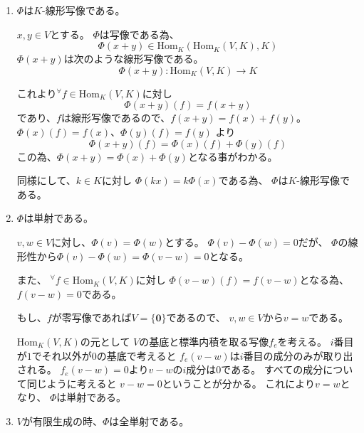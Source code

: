 \documentclass[12pt,b5paper]{ltjsarticle}
\begin{document}
\begin{enumerate}
 \item $\Phi$は$K$-線形写像である。

       $x,y\in V$とする。
       $\Phi$は写像である為、
       \begin{equation}
        \Phi (x+y) \in \mathrm{Hom}_K(\mathrm{Hom}_K(V,K),K)
       \end{equation}
       $\Phi(x+y)$は次のような線形写像である。
       \begin{equation}
        \Phi (x+y) : \mathrm{Hom}_K(V,K) \rightarrow K
       \end{equation}

       これより${}^{\forall}f\in\mathrm{Hom}_K(V,K)$に対し
       \begin{equation}
         \Phi (x+y)(f)=f(x+y)
       \end{equation}
       であり、$f$は線形写像であるので、$f(x+y)=f(x)+f(y)$。
        $\Phi (x)(f)=f(x)$、$\Phi (y)(f)=f(y)$ より
       \begin{equation}
        \Phi (x+y)(f) = \Phi (x)(f)+\Phi (y)(f)
       \end{equation}
       この為、$\Phi (x+y) = \Phi (x)+\Phi (y)$となる事がわかる。

       同様にして、$k\in K$に対し
       $\Phi (kx) = k \Phi (x)$である為、
       $\Phi$は$K$-線形写像である。

       \dotfill

 \item $\Phi$は単射である。

       $v,w\in V$に対し、$\Phi (v)=\Phi (w)$とする。
       $\Phi (v)-\Phi (w)=0$だが、
       $\Phi$の線形性から$\Phi (v)-\Phi (w)=\Phi (v-w)=0$となる。

       また、
       ${}^{\forall}f\in\mathrm{Hom}_K(V,K)$に対し
       $\Phi (v-w)(f)=f(v-w)$となる為、
       $f(v-w)=0$である。
       
       もし、$f$が零写像であれば$V=\{\bm{0}\}$であるので、
       $v,w\in V$から$v=w$である。

       $\mathrm{Hom}_K(V,K)$の元として
       $V$の基底と標準内積を取る写像$f_e$を考える。
       $i$番目が$1$でそれ以外が$0$の基底で考えると
       $f_e(v-w)$は$i$番目の成分のみが取り出される。
       $f_e(v-w)=0$より$v-w$の$i$成分は$0$である。
       すべての成分について同じように考えると
       $v-w=0$ということが分かる。
       これにより$v=w$となり、
       $\Phi$は単射である。
       
       \dotfill
 \item $V$が有限生成の時、$\Phi$は全単射である。


\end{enumerate}
\end{document}
